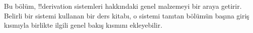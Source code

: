 

      {}
      {}

\begin{editorial}
Bu bölüm, !!{derivation} sistemleri hakkındaki genel malzemeyi bir araya
getirir. Belirli bir sistemi kullanan bir ders kitabı, o sistemi tanıtan
bölümün başına giriş kısmıyla birlikte ilgili genel bakış kısmını ekleyebilir.
\end{editorial}






\OLEndChapterHook


